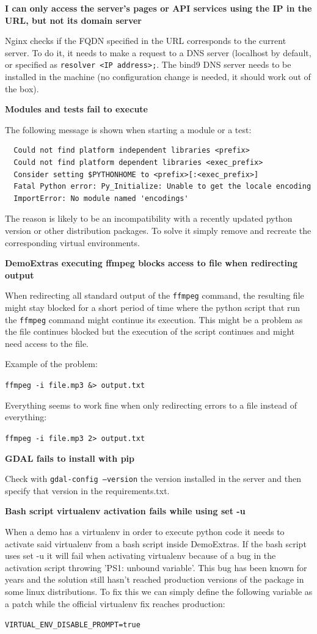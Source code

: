 \documentclass[a4paper,12pt]{article}
\begin{document}
\textbf{I can only access the server's pages or API services using the IP in the URL, but not its domain server}

Nginx checks if the FQDN specified in the URL corresponds to the current server. To do it, it needs to make a request to a DNS server (localhost by default, or specified as {\tt resolver <IP address>;}. The bind9 DNS server needs to be installed in the machine (no configuration change is needed, it should work out of the box).
\vspace{0.5cm}

\textbf{Modules and tests fail to execute}

The following message is shown when starting a module or a test:

\begin{verbatim}  
  Could not find platform independent libraries <prefix>
  Could not find platform dependent libraries <exec_prefix>
  Consider setting $PYTHONHOME to <prefix>[:<exec_prefix>]
  Fatal Python error: Py_Initialize: Unable to get the locale encoding
  ImportError: No module named 'encodings'
\end{verbatim}

The reason is likely to be an incompatibility with a recently updated python version or other distribution packages. To solve it simply remove and recreate the corresponding virtual environments.

\textbf{DemoExtras executing ffmpeg blocks access to file when redirecting output}

When redirecting all standard output of the {\tt ffmpeg} command, the resulting file might stay blocked for a short period of time where the python script that run the {\tt ffmpeg} command might continue its execution. This might be a problem as the file continues blocked but the execution of the script continues and might need access to the file.

Example of the problem:

{\tt ffmpeg -i file.mp3 \&> output.txt}

Everything seems to work fine when only redirecting errors to a file instead of everything:

{\tt ffmpeg -i file.mp3 2> output.txt}

\textbf{GDAL fails to install with pip}

Check with {\tt gdal-config --version} the version installed in the server and then specify that version in the requirements.txt.

\textbf{Bash script virtualenv activation fails while using set -u}

When a demo has a virtualenv in order to execute python code it needs to activate said virtualenv from a bash script inside DemoExtras. If the bash script uses set -u it will fail when activating virtualenv because of a bug in the activation script throwing 'PS1: unbound variable'. This bug has been known for years and the solution still hasn't reached production versions of the package in some linux distributions. To fix this we can simply define the following variable as a patch while the official virtualenv fix reaches production:

{\tt VIRTUAL\_ENV\_DISABLE\_PROMPT=true}



\end{document}
